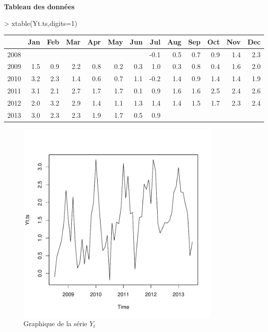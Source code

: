 \documentclass{article}
\begin{document}
\textbf{Tableau des données} 
\begin{Schunk}
\begin{Sinput}
> xtable(Yt.ts,digits=1) 
\end{Sinput}
\begin{table}[ht]
\centering
\begin{tabular}{rrrrrrrrrrrrr}
  \hline
 & Jan & Feb & Mar & Apr & May & Jun & Jul & Aug & Sep & Oct & Nov & Dec \\ 
  \hline
2008 &  &  &  &  &  &  & -0.1 & 0.5 & 0.7 & 0.9 & 1.4 & 2.3 \\ 
  2009 & 1.5 & 0.9 & 2.2 & 0.8 & 0.2 & 0.3 & 1.0 & 0.3 & 0.8 & 0.4 & 1.6 & 2.0 \\ 
  2010 & 3.2 & 2.3 & 1.4 & 0.6 & 0.7 & 1.1 & -0.2 & 1.4 & 0.9 & 1.4 & 1.4 & 1.9 \\ 
  2011 & 3.1 & 2.1 & 2.7 & 1.7 & 1.7 & 0.1 & 0.9 & 1.6 & 1.6 & 2.5 & 2.4 & 2.6 \\ 
  2012 & 2.0 & 3.2 & 2.9 & 1.4 & 1.1 & 1.3 & 1.4 & 1.4 & 1.5 & 1.7 & 2.3 & 2.4 \\ 
  2013 & 3.0 & 2.3 & 2.3 & 1.9 & 1.7 & 0.5 & 0.9 &  &  &  &  &  \\ 
   \hline
\end{tabular}
\end{table}\end{Schunk}
\begin{figure}[p]
  \centering
  \includegraphics[height=4in, width=4in]{exercice1-graph1.pdf}
  \caption{Graphique de la série $Y_t$}
  \label{fig:exercice1-graph1}
\end{figure}
\end{document}
